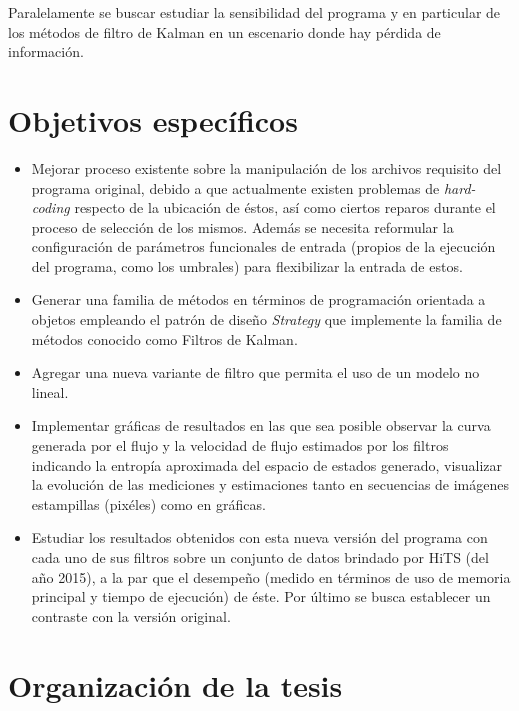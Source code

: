 Paralelamente se buscar estudiar la sensibilidad del programa y en particular de los m\'etodos de filtro de Kalman en un escenario donde hay p\'erdida de informaci\'on.

\section{Objetivos espec\'ificos}

\begin{itemize}


\item Mejorar proceso existente sobre la manipulaci\'on de los archivos requisito del programa original, debido a que actualmente existen problemas de \textit{hard-coding} respecto de la ubicaci\'on de \'estos, as\'i como ciertos reparos durante el proceso de selecci\'on de los mismos. Adem\'as se necesita reformular la configuraci\'on de par\'ametros funcionales de entrada (propios de la ejecuci\'on del programa, como los umbrales) para flexibilizar la entrada de estos. 
\bigskip

\item Generar una familia de m\'etodos en t\'erminos de programaci\'on orientada a objetos empleando el patr\'on de dise\~no \textit{Strategy} que implemente la familia de m\'etodos conocido como Filtros de Kalman.
\bigskip

\item Agregar una nueva variante de filtro que permita el uso de un modelo no lineal.
\bigskip

\item Implementar gr\'aficas de resultados en las que sea posible observar la curva generada por el flujo y la velocidad de flujo estimados por los filtros indicando la entrop\'ia aproximada del espacio de estados generado, visualizar la evoluci\'on de las mediciones y estimaciones tanto en secuencias de im\'agenes estampillas (pix\'eles) como en gr\'aficas.    
\bigskip

\item Estudiar los resultados obtenidos con esta nueva versi\'on del programa con cada uno de sus filtros sobre un conjunto de datos brindado por HiTS (del a\~no 2015), a la par que el desempe\~no (medido en t\'erminos de uso de memoria principal y tiempo de ejecuci\'on) de \'este. Por \'ultimo se busca establecer un contraste con la versi\'on original.     

\end{itemize}
\section{Organizaci\'on de la tesis}

